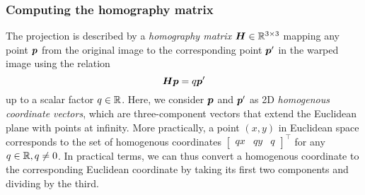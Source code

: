 \documentclass[../main.tex]{subfiles}
\begin{document}
\subsubsection{Computing the homography matrix}
\label{sec:homography_matrix}
The projection is described by a \emph{homography matrix} ${\bm{H}} \in \mathbb{R}^{3 \times 3}$ \cite{szeliski2011} mapping any point
${\bm{p}}$
from the original image to
the corresponding point
${\bm{p}}'$
in the warped image using the relation
\begin{equation}
    \label{eq:homography_matrix_relation}
    {\bm{H}}
    {\bm{p}}
    = q {\bm{p}}'
\end{equation}
up to a scalar factor $q \in \mathbb{R}$.
Here, we consider ${\bm{p}}$ and ${\bm{p}}'$ as 2D \emph{homogenous coordinate vectors}, which are three-component vectors that extend the Euclidean plane with points at infinity. 
More practically, a point $(x,y)$ in Euclidean space corresponds to the set of homogenous coordinates
$\begin{bmatrix}
    q x & q y & q
\end{bmatrix}^\top$ for any $q \in \mathbb{R},q \neq 0$.
In practical terms, we can thus convert a homogenous coordinate to the corresponding Euclidean coordinate by taking its first two components and dividing by the third.
\end{document}
